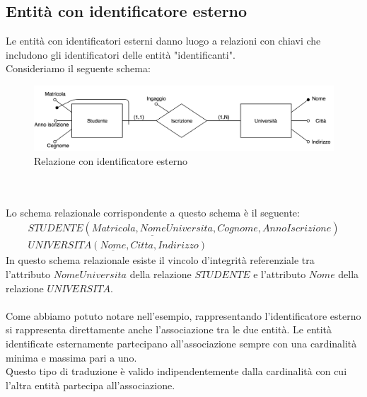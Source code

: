 \subsection{Entità con identificatore esterno}
Le entità con identificatori esterni danno luogo a relazioni con chiavi che includono gli identificatori delle entità "identificanti".\\
Consideriamo il seguente schema:
    \begin{figure}[h!]
        \centering
        \includegraphics[scale = 0.5]{15/img9}
        \caption{Relazione con identificatore esterno}
    \end{figure}\\\\
Lo schema relazionale corrispondente a questo schema è il seguente:
    \begin{equation}\begin{aligned}
        STUDENTE(\underline{Matricola, NomeUniversita}, Cognome, AnnoIscrizione)\\
        UNIVERSITA(\underline{Nome}, Citta, Indirizzo)
    \end{aligned}\end{equation}
In questo schema relazionale esiste il vincolo d'integrità referenziale tra l'attributo $NomeUniversita$ della relazione $STUDENTE$ e l'attributo $Nome$ della relazione $UNIVERSITA$.\\\\
Come abbiamo potuto notare nell'esempio, rappresentando l'identificatore esterno si rappresenta direttamente anche l'associazione tra le due entità. Le entità identificate esternamente partecipano all'associazione sempre con una cardinalità minima e massima pari a uno.\\
Questo tipo di traduzione è valido indipendentemente dalla cardinalità con cui l'altra entità partecipa all'associazione.

